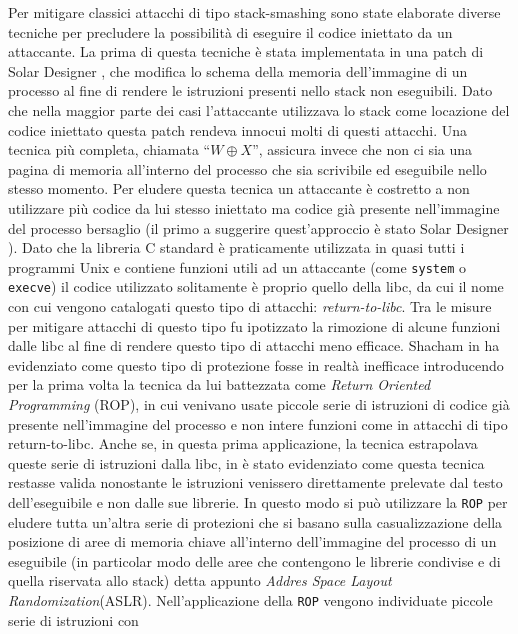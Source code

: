 Per mitigare classici attacchi di tipo stack-smashing sono state
elaborate diverse tecniche per precludere la possibilità di eseguire
il codice iniettato da un attaccante. La prima di questa tecniche è
stata implementata in una patch di Solar Designer \cite{stackpatch},
che modifica lo schema della memoria dell'immagine di un processo al
fine di rendere le istruzioni presenti nello stack non eseguibili. Dato
che nella maggior parte dei casi l'attaccante utilizzava lo stack come
locazione del codice iniettato questa patch rendeva innocui molti di
questi attacchi. Una tecnica più completa, chiamata ``$W \oplus X$'',
assicura invece che non ci sia una pagina di memoria all'interno del
processo che sia scrivibile ed eseguibile nello stesso momento. Per
eludere questa tecnica un attaccante è costretto a non utilizzare più
codice da lui stesso iniettato ma codice già presente nell'immagine
del processo bersaglio (il primo a suggerire quest'approccio è stato
Solar Designer \cite{solar-return-to-libc}). Dato che la libreria C
standard è praticamente utilizzata in quasi tutti i programmi Unix e
contiene funzioni utili ad un attaccante (come \lstinline{system} o
\lstinline{execve}) il codice utilizzato solitamente è proprio quello
della libc, da cui il nome con cui vengono catalogati questo tipo di
attacchi: \emph{return-to-libc}. Tra le misure per mitigare attacchi
di questo tipo fu ipotizzato la rimozione di alcune funzioni dalle
libc al fine di rendere questo tipo di attacchi meno efficace. Shacham
in \cite{Shacham-2007} ha evidenziato come questo tipo di protezione
fosse in realtà inefficace introducendo per la prima volta la tecnica
da lui battezzata come \emph{Return Oriented Programming} (ROP), in
cui venivano usate piccole serie di istruzioni di codice già presente
nell'immagine del processo e non intere funzioni come in attacchi di
tipo return-to-libc. Anche se, in questa prima applicazione, la
tecnica estrapolava queste serie di istruzioni dalla libc, in
\cite{payla} è stato evidenziato come questa tecnica restasse valida
nonostante le istruzioni venissero direttamente prelevate dal testo
dell'eseguibile e non dalle sue librerie. In questo modo si può
utilizzare la \lstinline{ROP} per eludere tutta un'altra serie di
protezioni che si basano sulla casualizzazione della posizione di aree
di memoria chiave all'interno dell'immagine del processo di un
eseguibile (in particolar modo delle aree che contengono le librerie
condivise e di quella riservata allo stack) detta appunto \emph{Addres
  Space Layout Randomization}(ASLR). Nell'applicazione della
\lstinline{ROP} vengono individuate piccole serie di istruzioni con
